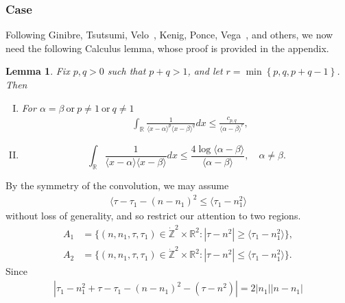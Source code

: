 \documentclass[12pt,reqno]{amsart}
\numberwithin{equation}{section}  %
\newcommand{\rr}{\mathbb{R}}
\newcommand{\zz}{\mathbb{Z}}
\newtheorem{lemma}[theorem]{Lemma}
\begin{document}
\subsubsection{Case } 
\label{ssec:case-it-6}
Following Ginibre, Tsutsumi, Velo~\cite{Ginibre:1997jp}, Kenig, Ponce, Vega~\cite{Kenig:1996yn}, and others,
we now need the following Calculus lemma, whose proof is provided in the
appendix.
\begin{lemma}
\label{lem:calc}
Fix $p, q > 0$ such that $p +q >1$, and let $r =\min\left\{p, q, p+q-1
\right\}$. Then 
\begin{enumerate}[(I)]
\item
For $\alpha=\beta \ \text{or} \ p \neq 1 \ \text{or} \ q \neq 1$
\begin{equation*}
\begin{split}
& \int_{\rr} \frac{1}{\langle x - \alpha \rangle ^{p} \langle x -
\beta \rangle
^{q}} d x
\le \frac{c_{p,q}}{\langle \alpha - \beta \rangle ^{r}}, 
\end{split}
\end{equation*}
\item
\begin{equation*}
\int_{\rr} \frac{1}{\langle x - \alpha \rangle  \langle x - \beta
\rangle} d x
\le  \frac{4 \log \langle \alpha - \beta \rangle}{\langle \alpha - \beta
\rangle}, \quad \alpha \neq \beta.
\end{equation*}
\end{enumerate}
\end{lemma}
By the symmetry of the convolution, we may assume
\begin{equation*}
\begin{split}
\langle \tau - \tau_{1} - (n - n_{1})^{2} \le
\langle \tau_{1} - n_{1}^{2} \rangle 
\end{split}
\end{equation*}
without loss of generality, and so restrict our attention to two regions.
\begin{align*}
  A_{1}&=\{(n, n_1, \tau, \tau_1)\in \dot{\zz}^{2} \times \rr^{2}: |\tau-n^{2}|\ge \langle \tau_{1} - n_{1}^{2} \rangle  \},\\
  A_{2}&=\{(n, n_1, \tau, \tau_1)\in \dot{\zz}^{2} \times \rr^{2}: |\tau-n^2| \le \langle \tau_{1} - n_{1}^{2} \rangle\}.
\end{align*} 
Since
\begin{equation*}
\begin{split}
| \tau_{1} - n_{1}^{2} + \tau - \tau_{1} - (n - n_{1})^{2} - (\tau - n^{2}) | = 2| n_{1} || n - n_{1} |
\end{split}
\end{equation*}
\end{document}
